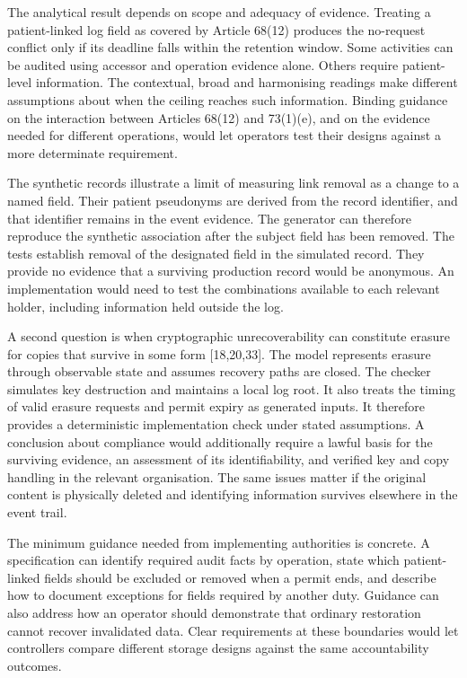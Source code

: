 \documentclass[preprint,review,12pt]{elsarticle}
\begin{document}
The analytical result depends on scope and adequacy of evidence.
Treating a patient-linked log field as covered by Article 68(12)
produces the no-request conflict only if its deadline falls within the
retention window. Some activities can be audited using accessor and
operation evidence alone. Others require patient-level information. The
contextual, broad and harmonising readings make different assumptions
about when the ceiling reaches such information. Binding guidance on the
interaction between Articles 68(12) and 73(1)(e), and on the evidence
needed for different operations, would let operators test their designs
against a more determinate requirement.

The synthetic records illustrate a limit of measuring link removal as a
change to a named field. Their patient pseudonyms are derived from the
record identifier, and that identifier remains in the event evidence.
The generator can therefore reproduce the synthetic association after
the subject field has been removed. The tests establish removal of the
designated field in the simulated record. They provide no evidence that
a surviving production record would be anonymous. An implementation
would need to test the combinations available to each relevant holder,
including information held outside the log.

A second question is when cryptographic unrecoverability can constitute
erasure for copies that survive in some form {[}18,20,33{]}. The model
represents erasure through observable state and assumes recovery paths
are closed. The checker simulates key destruction and maintains a local
log root. It also treats the timing of valid erasure requests and permit
expiry as generated inputs. It therefore provides a deterministic
implementation check under stated assumptions. A conclusion about
compliance would additionally require a lawful basis for the surviving
evidence, an assessment of its identifiability, and verified key and
copy handling in the relevant organisation. The same issues matter if
the original content is physically deleted and identifying information
survives elsewhere in the event trail.

The minimum guidance needed from implementing authorities is concrete. A
specification can identify required audit facts by operation, state
which patient-linked fields should be excluded or removed when a permit
ends, and describe how to document exceptions for fields required by
another duty. Guidance can also address how an operator should
demonstrate that ordinary restoration cannot recover invalidated data.
Clear requirements at these boundaries would let controllers compare
different storage designs against the same accountability outcomes.
\end{document}
